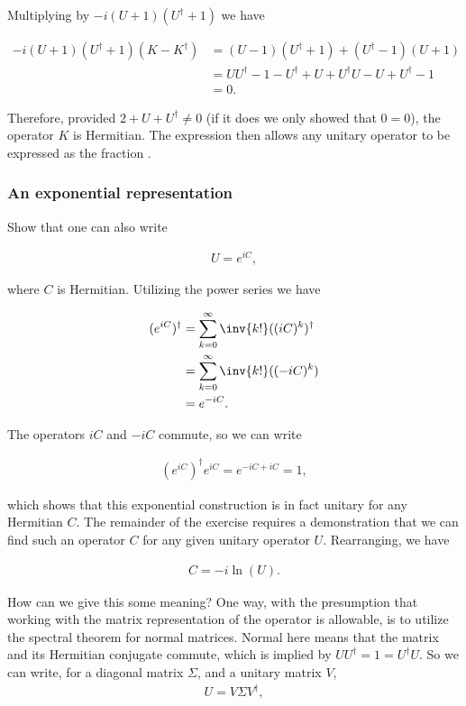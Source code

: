 Multiplying by $-i(U+1)(U^\dagger+1)$ we have

\begin{align*}
-i(U+1)(U^\dagger+1)(K - K^\dagger) 
&= ( U - 1 )(U^\dagger + 1) + ( U^\dagger - 1 )(U + 1) \\
&= U U^\dagger - 1 - U^\dagger + U     + U^\dagger U - U + U^\dagger - 1 \\
&= 0.
\end{align*}

Therefore, provided $2 + U + U^\dagger \ne 0$ (if it does we only showed that $0 = 0$), the operator $K$ is Hermitian.  The expression  then allows any unitary operator to be expressed as the fraction .

\subsubsection{An exponential representation}

Show that one can also write

\begin{align*}
U = e^{i C},
\end{align*}

where $C$ is Hermitian.  Utilizing the power series we have

\begin{align*}
(e^{iC})^\dagger
&= 
\sum_{k=0}^\infty \inv{k!} ((iC)^k)^\dagger \\
&= 
\sum_{k=0}^\infty \inv{k!} ((-iC)^k) \\
&= 
e^{-iC}.
\end{align*}

The operators $i C$ and $-i C$ commute, so we can write

\begin{align*}
(e^{iC})^\dagger e^{iC} = e^{ -iC + iC } = 1,
\end{align*}

which shows that this exponential construction is in fact unitary for any Hermitian $C$.  The remainder of the exercise requires a demonstration that we can find such an operator $C$ for any given unitary operator $U$.  Rearranging, we have

\begin{align}\label{eqn:desaiDiracNotes:10}
C = -i \ln ( U ).
\end{align}

How can we give this some meaning?  One way, with the presumption that working with the matrix representation of the operator is allowable, is to utilize the spectral theorem for normal matrices.  Normal here means that the matrix and its Hermitian conjugate commute, which is implied by $U U^\dagger = 1 = U^\dagger U$.  So we can write, for a diagonal matrix $\Sigma$, and a unitary matrix $V$, 
\begin{align*}
U = V \Sigma V^\dagger,
\end{align*}

